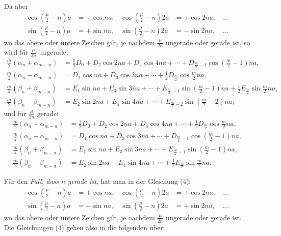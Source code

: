 \documentclass[12pt,a4paper]{article}
\begin{document}
Da aber
\begin{align*}
\cos(\tfrac{\mu}{2}-n)a &= -\cos na, & \cos(\tfrac{\mu}{2}-n)2a &= +\cos 2na, \quad \ldots\\
\sin(\tfrac{\mu}{2}-n)a &= +\sin na, & \sin(\tfrac{\mu}{2}-n)2a &= -\sin 2na, \quad \ldots
\end{align*}
wo das obere oder untere Zeichen gilt, je nachdem $\frac{\mu}{2n}$ ungerade oder gerade ist, so wird für $\frac{\mu}{2n}$ ungerade:
\begin{equation}
\tag{5}
\begin{aligned}
\tfrac{m}{2}(\alpha_n + \alpha_{m-n}) &= \tfrac{1}{2}D_0 + D_2 \cos 2na + D_4 \cos 4na + \cdots + D_{\frac{m}{2}-1} \cos(\tfrac{m}{2}-1)na,\\
\tfrac{m}{2}(\alpha_n - \alpha_{m-n}) &= D_1 \cos na + D_3 \cos 3na + \cdots + \tfrac{1}{2}D_{\frac{m}{2}} \cos\tfrac{m}{2}na,\\
\tfrac{m}{2}(\beta_n + \beta_{m-n}) &= E_1 \sin na + E_3 \sin 3na + \cdots + E_{\frac{m}{2}-1} \sin(\tfrac{m}{2}-1)na + \tfrac{1}{2}E_{\frac{m}{2}} \sin\tfrac{m}{2}na,\\
\tfrac{m}{2}(\beta_n - \beta_{m-n}) &= E_2 \sin 2na + E_4 \sin 4na + \cdots + E_{\frac{m}{2}-2} \sin(\tfrac{m}{2}-2)na;
\end{aligned}
\end{equation}
und für $\frac{\mu}{2n}$ gerade:
\begin{equation}
\tag{$5^*$}
\begin{aligned}
\tfrac{m}{2}(\alpha_n + \alpha_{m-n}) &= \tfrac{1}{2}D_0 + D_2 \cos 2na + D_4 \cos 4na + \cdots + \tfrac{1}{2}D_{\frac{m}{2}} \cos\tfrac{m}{2}na,\\
\tfrac{m}{2}(\alpha_n - \alpha_{m-n}) &= D_1 \cos na + D_3 \cos 3na + \cdots + D_{\frac{m}{2}-1} \cos(\tfrac{m}{2}-1)na,\\
\tfrac{m}{2}(\beta_n + \beta_{m-n}) &= E_1 \sin na + E_3 \sin 3na + \cdots + E_{\frac{m}{2}-1} \sin(\tfrac{m}{2}-1)na,\\
\tfrac{m}{2}(\beta_n - \beta_{m-n}) &= E_2 \sin 2na + E_4 \sin 4na + \cdots + \tfrac{1}{2}E_{\frac{m}{2}} \sin\tfrac{m}{2}na.
\end{aligned}
\end{equation}

Für den \textit{Fall, dass $n$ gerade ist}, hat man in der Gleichung (4):
\begin{align*}
\cos(\tfrac{\mu}{2}-n)a &= +\cos na, & \cos(\tfrac{\mu}{2}-n)2a &= +\cos 2na, \quad \ldots\\
\sin(\tfrac{\mu}{2}-n)a &= -\sin na, & \sin(\tfrac{\mu}{2}-n)2a &= +\sin 2na, \quad \ldots
\end{align*}
wo das obere oder untere Zeichen gilt, je nachdem $\frac{\mu}{2n}$ ungerade oder gerade ist. Die Gleichungen (4) gehen also in die folgenden über:
\end{document}
